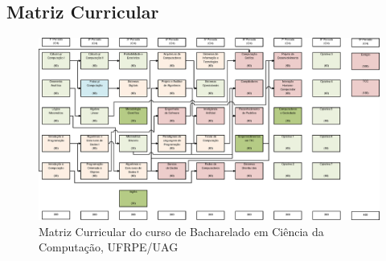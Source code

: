 \documentclass[
	12pt,				%
	openright,			%
  oneside,     %
	a4paper,			%
	english,			%
	french,				%
	spanish,			%
	brazil				%
	]{abntex2}
\begin{document}

\begin{apendicesenv}

\partapendices

\chapter{Matriz Curricular}

\begin{landscape}
  \begin{figure}[hbtp]
    \centering
      \caption{\label{fig:matrizcurricular}Matriz Curricular do curso de Bacharelado em Ciência da Computação, UFRPE/UAG}
      \includegraphics[width=1.55\textwidth]{images/matriz6.eps}
  \end{figure}
\end{landscape}


\end{apendicesenv}
\end{document}
